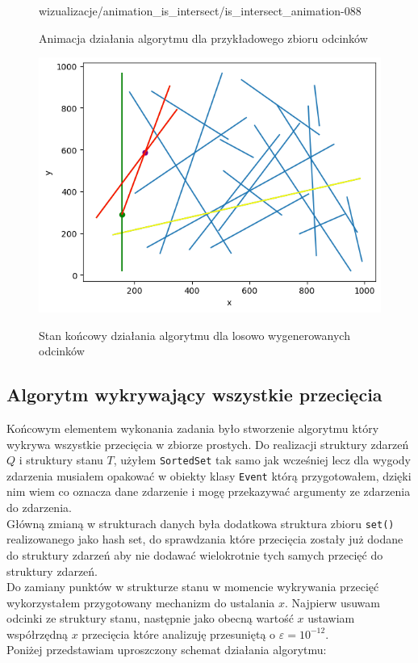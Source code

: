 \documentclass[a4paper]{article}
\begin{document}
    \begin{figure}[H]
        \centering
        {wizualizacje/animation_is_intersect/is_intersect_animation-}{0}{88}
        \caption{Animacja działania algorytmu dla przykładowego zbioru odcinków}
        \label{fig:is_intersect_animation}
    \end{figure}

    \begin{figure}[H]
        \centering
        \includegraphics[width=.8\textwidth]{wizualizacje/is_intersect_random.png}
        \label{fig:is_intersect_res_random}
        \caption{Stan końcowy działania algorytmu dla losowo wygenerowanych odcinków}
    \end{figure}

\subsection{Algorytm wykrywający wszystkie przecięcia}
Końcowym elementem wykonania zadania było stworzenie algorytmu który wykrywa wszystkie przecięcia w zbiorze 
prostych. Do realizacji struktury zdarzeń $Q$ i struktury stanu $T$, użyłem \verb|SortedSet| tak samo jak wcześniej
lecz dla wygody zdarzenia musiałem opakować w obiekty klasy \verb|Event| którą przygotowałem, dzięki nim 
wiem co oznacza dane zdarzenie i mogę przekazywać argumenty ze zdarzenia do zdarzenia.\\
Główną zmianą w strukturach danych była dodatkowa struktura zbioru \verb|set()| realizowanego jako 
hash set, do sprawdzania które przecięcia zostały już dodane do struktury zdarzeń aby nie dodawać wielokrotnie
tych samych przecięć do struktury zdarzeń. \\
Do zamiany punktów w strukturze stanu w momencie wykrywania przecięć wykorzystałem przygotowany mechanizm 
do ustalania $x$. Najpierw usuwam odcinki ze struktury stanu, następnie jako obecną wartość $x$ ustawiam 
współrzędną $x$ przecięcia które analizuję przesuniętą o $\varepsilon = 10^{-12}$.\\
Poniżej przedstawiam uproszczony schemat działania algorytmu:
\end{document}
